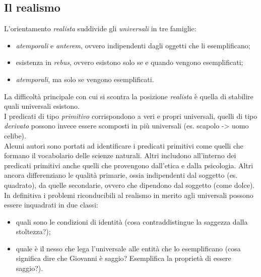 \documentclass[a4paper,12pt]{article}
\begin{document}
\subsection{Il realismo} %
L'orientamento \textit{realista} suddivide gli \textit{universali} in tre famiglie:
\begin{itemize}
    \item \textit{atemporali} e \textit{anterem}, ovvero indipendenti dagli oggetti che li esemplificano;
    \item esistenza in \textit{rebus}, ovvero esistono solo se e quando vengono esemplificati;
    \item \textit{atemporali}, ma solo se vengono esemplificati.
\end{itemize}
La difficoltà principale con cui si scontra la posizione \textit{realista} è quella di stabilire quali universali esistono.
\\ I predicati di tipo \textit{primitivo} corrispondono a veri e propri universali, quelli di tipo \textit{derivato} possono
invece essere scomposti in più universali (es. scapolo -> uomo celibe).
\\ Alcuni autori sono portati ad identificare i predicati primitivi come quelli che formano il vocabolario delle scienze
naturali. Altri includono all'interno dei predicati primitivi anche quelli che provengono dall'etica e dalla psicologia. Altri 
ancora differenziano le qualità primarie, ossia indipendenti dal soggetto (es. quadrato), da quelle secondarie, ovvero
che dipendono dal soggetto (come dolce).
In definitiva i problemi riconducibili al realismo in merito agli universali possono essere inquadrati in due classi:
\begin{itemize}
    \item quali sono le condizioni di identità (cosa contraddistingue la saggezza dalla stoltezza?);
    \item quale è il nesso che lega l'universale alle entità che lo esemplificano (cosa significa dire che Giovanni
    è saggio? Esemplifica la proprietà di essere saggio?).
\end{itemize}
\end{document}
